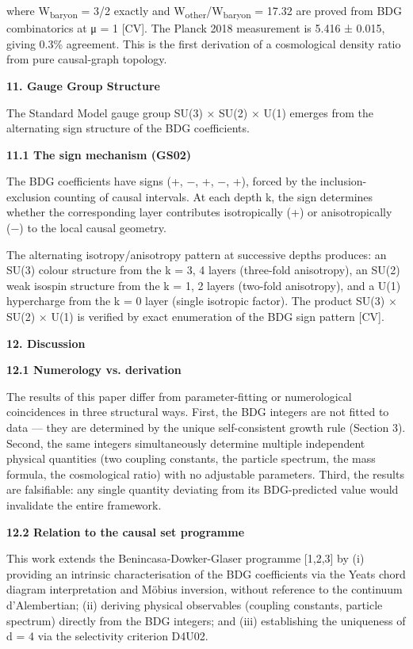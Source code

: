 \documentclass[12pt,a4paper]{article}
\begin{document}
where W\textsubscript{baryon} = 3/2 exactly and
W\textsubscript{other}/W\textsubscript{baryon} = 17.32 are proved from
BDG combinatorics at μ = 1 {[}CV{]}. The Planck 2018 measurement is
5.416 ± 0.015, giving 0.3\% agreement. This is the first derivation of a
cosmological density ratio from pure causal-graph topology.

\textbf{11. Gauge Group Structure}

The Standard Model gauge group SU(3) × SU(2) × U(1) emerges from the
alternating sign structure of the BDG coefficients.

\textbf{11.1 The sign mechanism (GS02)}

The BDG coefficients have signs (+, −, +, −, +), forced by the
inclusion-exclusion counting of causal intervals. At each depth k, the
sign determines whether the corresponding layer contributes
isotropically (+) or anisotropically (−) to the local causal geometry.

The alternating isotropy/anisotropy pattern at successive depths
produces: an SU(3) colour structure from the k = 3, 4 layers (three-fold
anisotropy), an SU(2) weak isospin structure from the k = 1, 2 layers
(two-fold anisotropy), and a U(1) hypercharge from the k = 0 layer
(single isotropic factor). The product SU(3) × SU(2) × U(1) is verified
by exact enumeration of the BDG sign pattern {[}CV{]}.

\textbf{12. Discussion}

\textbf{12.1 Numerology vs. derivation}

The results of this paper differ from parameter-fitting or numerological
coincidences in three structural ways. First, the BDG integers are not
fitted to data --- they are determined by the unique self-consistent
growth rule (Section 3). Second, the same integers simultaneously
determine multiple independent physical quantities (two coupling
constants, the particle spectrum, the mass formula, the cosmological
ratio) with no adjustable parameters. Third, the results are
falsifiable: any single quantity deviating from its BDG-predicted value
would invalidate the entire framework.

\textbf{12.2 Relation to the causal set programme}

This work extends the Benincasa-Dowker-Glaser programme {[}1,2,3{]} by
(i) providing an intrinsic characterisation of the BDG coefficients via
the Yeats chord diagram interpretation and Möbius inversion, without
reference to the continuum d'Alembertian; (ii) deriving physical
observables (coupling constants, particle spectrum) directly from the
BDG integers; and (iii) establishing the uniqueness of d = 4 via the
selectivity criterion D4U02.
\end{document}
